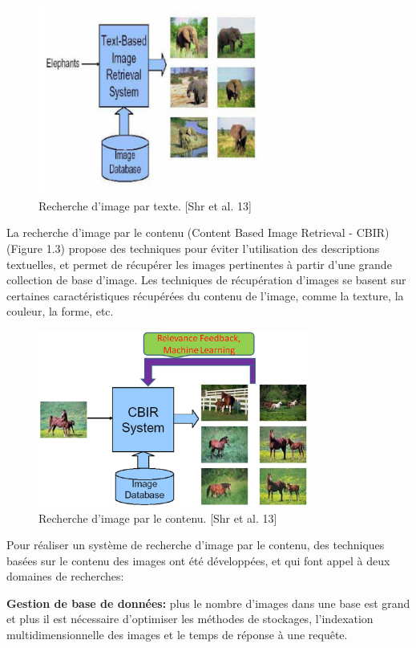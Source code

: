 \begin{figure}[H]
	\centering
		\includegraphics[width=3in]{Figures/textBasedIR.png}
	\caption[An Electron]{Recherche d'image par texte. [Shr et al. 13]}
	\label{fig:Electron}
\end{figure}
	
	La recherche d'image par le contenu (Content Based Image Retrieval - CBIR) (Figure 1.3) propose des techniques pour éviter l'utilisation des descriptions textuelles, et permet de récupérer les images pertinentes à partir d'une grande collection de base d'image. Les techniques de récupération d'images se basent sur certaines caractéristiques récupérées du contenu de l'image, comme la texture, la couleur, la forme, etc.

\begin{figure}[H]
	\centering
		\includegraphics[width=3.5in]{Figures/cbir.JPG}
	\caption[An Electron]{Recherche d'image par le contenu. [Shr et al. 13]}
	\label{fig:Electron}
\end{figure}


	Pour réaliser un système de recherche d'image par le contenu, des techniques basées sur le contenu des images ont été développées, et qui font appel à deux domaines de recherches:

\textbf{Gestion de base de données:} plus le nombre d'images dans une base est grand et plus il est nécessaire d'optimiser les méthodes de stockages, l'indexation multidimensionnelle des images et le temps de réponse à une requête.

